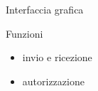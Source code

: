 \begin{frame}{Interfaccia grafica}
\begin{minipage}{0.3\textwidth}
\begin{figure}
				\end{figure}
			\end{minipage}
			\begin{minipage}{0.4\textwidth}
				\begin{block}{Funzioni}
					\begin{itemize}
						\item invio e ricezione
						\item autorizzazione
					\end{itemize}
				\end{block}
			\end{minipage}
		\end{frame}

